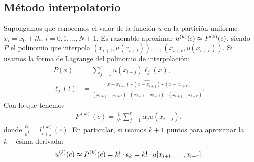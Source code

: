 \subsection{Método interpolatorio}
\noindent Supongamos que conocemos el valor de la función $u$ en la partición uniforme $x_i = x_0 +ih$, $i = 0,1,\ldots,N+1$. Es razonable aproximar  $u^{(k)}(c) \thickapprox P^{(k)}(c)$, siendo $P$ el polinomio que interpola $(x_{i+l}, u(x_{i+l})), \ldots, (x_{i+r},u(x_{i+r}))$. Si usamos la forma de Lagrange del polinomio de interpolación:
\begin{align*}
    P(x) &= \sum_{j=1}^{r} u(x_{i+j})\ell_j(x), \\
    \ell_j(t) &= \frac{(x-x_{i+l}) \cdots \widehat{(x - x_{i+j})} \cdots (x-x_{i+r})}{(x_{i+j} -x_{i+l}) \cdots \widehat{(x_{i+j} - x_{i+j})} \cdots (x_{i+j} - x_{i+r})}.
\end{align*}
Con lo que tenemos
\begin{align*}
    P^{(k)}(c) = \frac{1}{h^k} \sum_{j=1}^{r} \alpha_j u(x_{i+j}),
\end{align*}
donde $\frac{\alpha_j}{h^k} = l^{(k)}_{i+j}(c)$. En particular, si usamos $k+1$ puntos para aproximar la $k-$ésima derivada:
\begin{align*}
    u^{(k)}(c) \thickapprox P^{(k)}(c) = k! \cdot a_k = k! \cdot u[x_{i+l},\ldots,x_{i+r}].
\end{align*}

